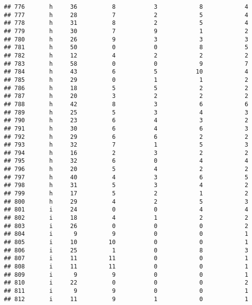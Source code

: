 \documentclass[
]{article}
\begin{document}
\begin{verbatim}
## 776       h     36          8           3            8            4
## 777       h     28          7           2            5            4
## 778       h     31          8           2            5            4
## 779       h     30          7           9            1            2
## 780       h     26          9           3            3            3
## 781       h     50          0           0            8            5
## 782       h     12          4           2            2            2
## 783       h     58          0           0            9            7
## 784       h     43          6           5           10            4
## 785       h     29          0           1            1            2
## 786       h     18          5           5            2            2
## 787       h     20          3           2            2            2
## 788       h     42          8           3            6            6
## 789       h     25          5           3            4            3
## 790       h     23          6           4            3            2
## 791       h     30          6           4            6            3
## 792       h     29          6           6            2            2
## 793       h     32          7           1            5            3
## 794       h     16          2           3            2            2
## 795       h     32          6           0            4            4
## 796       h     20          5           4            2            2
## 797       h     40          4           3            6            5
## 798       h     31          5           3            4            2
## 799       h     17          5           2            1            2
## 800       h     29          4           2            5            3
## 801       i     24          0           0            4            4
## 802       i     18          4           1            2            2
## 803       i     26          0           0            0            2
## 804       i      9          9           0            0            1
## 805       i     10         10           0            0            1
## 806       i     25          1           0            8            3
## 807       i     11         11           0            0            1
## 808       i     11         11           0            0            1
## 809       i      9          9           0            0            1
## 810       i     22          0           0            0            2
## 811       i      9          9           0            0            1
## 812       i     11          9           1            0            1

\end{verbatim}
\end{document}
